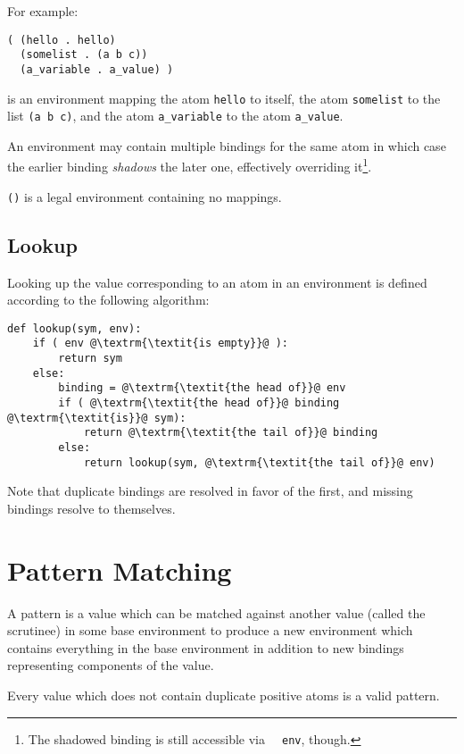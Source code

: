 \documentclass[twocolumn]{report}
\begin{document}
For example:
\begin{verbatim}
( (hello . hello)
  (somelist . (a b c))
  (a_variable . a_value) )
\end{verbatim}
is an environment mapping the atom \texttt{hello} to itself, the atom \texttt{somelist} to the list \texttt{(a b c)}, and the atom \texttt{a_variable} to the atom \texttt{a_value}.

An environment may contain multiple bindings for the same atom in which case the earlier binding \emph{shadows} the later one, effectively overriding it\footnote{The shadowed binding is still accessible via \texttt{~~env}, though.}.

\texttt{()} is a legal environment containing no mappings.

\subsection{Lookup}
\label{subsec:lookup}

Looking up the value corresponding to an atom in an environment is defined according to the following algorithm:
\begin{verbatim}
def lookup(sym, env):
    if ( env @\textrm{\textit{is empty}}@ ):
        return sym
    else:
        binding = @\textrm{\textit{the head of}}@ env
        if ( @\textrm{\textit{the head of}}@ binding @\textrm{\textit{is}}@ sym):
            return @\textrm{\textit{the tail of}}@ binding
        else:
            return lookup(sym, @\textrm{\textit{the tail of}}@ env)
\end{verbatim}

Note that duplicate bindings are resolved in favor of the first, and missing bindings resolve to themselves.

\section{Pattern Matching}
\label{sec:pattern_matching}

A pattern is a value which can be matched against another value (called the scrutinee) in some base environment to produce a new environment which contains everything in the base environment in addition to new bindings representing components of the value.

Every value which does not contain duplicate positive atoms is a valid pattern.
\end{document}
